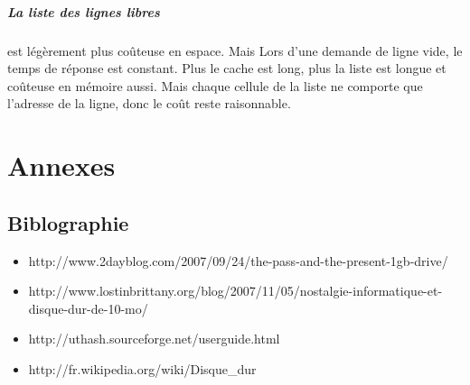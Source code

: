 \documentclass[a4paper,10pt]{article}
\begin{document}
\subparagraph{La liste des lignes libres} est légèrement plus coûteuse en espace. Mais Lors d'une demande de ligne vide, le temps de réponse est constant. 
Plus le cache est long, plus la liste est longue et coûteuse en mémoire aussi. Mais chaque cellule de la liste ne comporte que l'adresse de la ligne, donc 
le coût reste raisonnable.


\newpage
\section{Annexes}
\subsection{Biblographie}
\begin{itemize}
 \item http://www.2dayblog.com/2007/09/24/the-pass-and-the-present-1gb-drive/
 \item http://www.lostinbrittany.org/blog/2007/11/05/nostalgie-informatique-et-disque-dur-de-10-mo/
 \item http://uthash.sourceforge.net/userguide.html
 \item http://fr.wikipedia.org/wiki/Disque\_dur
\end{itemize}
\end{document}
